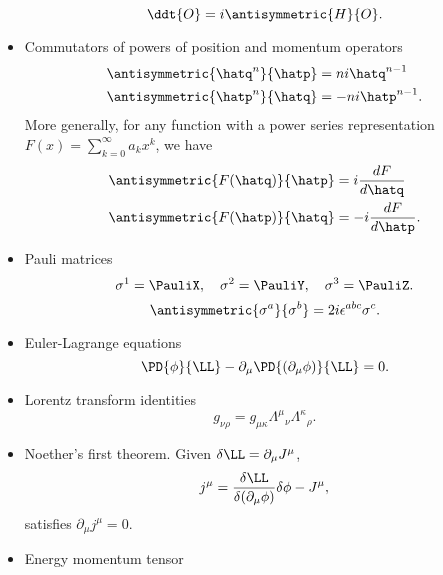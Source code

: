 \begin{itemize}
\begin{dmath}\label{eqn:usefulFormulas:220}
\ddt{O} = i \antisymmetric{H}{O}.
\end{dmath}
\item Commutators of powers of position and momentum operators
\begin{dmath}\label{eqn:usefulFormulas:240}
\begin{aligned}
\antisymmetric{\hatq^n}{\hatp} &= n i \hatq^{n-1} \\
\antisymmetric{\hatp^n}{\hatq} &= -n i \hatp^{n-1}.
\end{aligned}
\end{dmath}
More generally, for any function with a power series representation \( F(x) = \sum_{k = 0}^\infty a_k x^k \), we have
\begin{dmath}\label{eqn:usefulFormulas:260}
\begin{aligned}
\antisymmetric{F(\hatq)}{\hatp} &= i \frac{dF}{d\hatq} \\
\antisymmetric{F(\hatp)}{\hatq} &= -i \frac{dF}{d\hatp}.
\end{aligned}
\end{dmath}
\item Pauli matrices
\begin{equation}\label{eqn:usefulFormulas:280}
\sigma^1 = \PauliX, \quad
\sigma^2 = \PauliY, \quad
\sigma^3 = \PauliZ.
\end{equation}
\begin{dmath}\label{eqn:usefulFormulas:300}
\antisymmetric{\sigma^a}{\sigma^b} = 2 i \epsilon^{a b c} \sigma^c.
\end{dmath}
\item Euler-Lagrange equations
\begin{dmath}\label{eqn:usefulFormulas:320}
\PD{\phi}{\LL} - \partial_\mu \PD{(\partial_\mu \phi)}{\LL} = 0.
\end{dmath}
\item Lorentz transform identities
\begin{dmath}\label{eqn:usefulFormulas:340}
g_{\nu\rho}
=
g_{\mu \kappa}
{\Lambda^\mu}_\nu
{\Lambda^\kappa}_\rho.
\end{dmath}
\item Noether's first theorem.  Given \( \delta \LL = \partial_\mu J^\mu \),
\begin{dmath}\label{eqn:usefulFormulas:480}
j^\mu =
\frac{\delta \LL}{\delta(\partial_\mu \phi)} \delta \phi  - J^\mu,
\end{dmath}
satisfies \( \partial_\mu j^\mu = 0 \).
\item Energy momentum tensor

\end{itemize}
